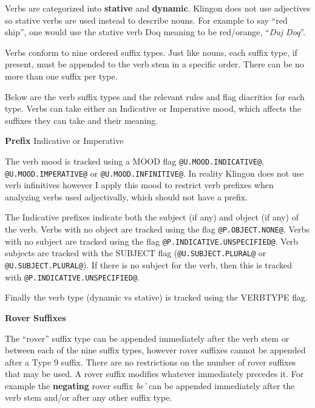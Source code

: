 \documentclass[11pt]{article}
\begin{document}
Verbs are categorized into \textbf{stative} and \textbf{dynamic}. Klingon does not use adjectives so stative verbs are used instead to describe nouns. For example to say ``red ship'', one would use the stative verb Doq meaning to be red/orange, ``\textit{Duj Doq}''.

Verbs conform to nine ordered suffix types. Just like nouns, each suffix type, if present, must be appended to the verb stem in a specific order. There can be no more than one suffix per type.

Below are the verb suffix types and the relevant rules and flag diacritics for each type. Verbs can take either an Indicative or Imperative mood, which affects the suffixes they can take and their meaning.

\textbf{Prefix} Indicative or Imperative

The verb mood is tracked using a MOOD flag \texttt{@U.MOOD.INDICATIVE@}, \texttt{@U.MOOD.IMPERATIVE@} or \texttt{@U.MOOD.INFINITIVE@}. In reality Klingon does not use verb infinitives however I apply this mood to restrict verb prefixes when analyzing verbs used adjectivally, which should not have a prefix.

The Indicative prefixes indicate both the subject (if any) and object (if any) of the verb. Verbs with no object are tracked using the flag \texttt{@P.OBJECT.NONE@}. Verbs with no subject are tracked using the flag \texttt{@P.INDICATIVE.UNSPECIFIED@}. Verb subjects are tracked with the SUBJECT flag (\texttt{@U.SUBJECT.PLURAL@} or \texttt{@U.SUBJECT.PLURAL@}). If there is no subject for the verb, then this is tracked with \texttt{@P.INDICATIVE.UNSPECIFIED@}.

Finally the verb type (dynamic vs stative) is tracked using the VERBTYPE flag.

\textbf{Rover Suffixes}

The ``rover'' suffix type can be appended immediately after the verb stem or between each of the nine suffix types, however rover suffixes cannot be appended after a Type 9 suffix. There are no restrictions on the number of rover suffixes that may be used. A rover suffix modifies whatever immediately precedes it. For example the \textbf{negating} rover suffix \textit{be'} can be appended immediately after the verb stem and/or after any other suffix type.
\end{document}
